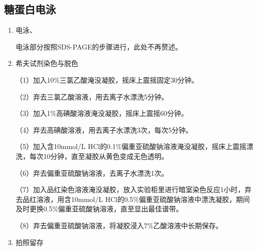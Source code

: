 \subsection{糖蛋白电泳}
\begin{enumerate}
    \item 电泳、

\hspace*{2em} 电泳部分按照SDS-PAGE的步骤进行，此处不再赘述。

    \item 希夫试剂染色与脱色
    
\hspace*{2em} （1）加入10\%三氯乙酸淹没凝胶，摇床上震摇固定30分钟。

\hspace*{2em} （2）弃去三氯乙酸溶液，用去离子水漂洗5分钟。

\hspace*{2em} （3）加入1\%高碘酸溶液淹没凝胶，摇床上震摇60分钟。

\hspace*{2em} （4）弃去高碘酸溶液，用去离子水漂洗3次，每次5分钟。

\hspace*{2em} （5）加入含10mmol/L HCl的0.1\%偏重亚硫酸钠溶液淹没凝胶，摇床上震摇漂洗，每次10分钟，直至凝胶从黄色变成无色透明。

\hspace*{2em} （6）弃去偏重亚硫酸钠溶液，去离子水漂洗1次。

\hspace*{2em} （7）加入品红染色溶液淹没凝胶，放入实验柜里进行暗室染色反应1小时，弃去品红溶液，用含10mmol/L HCl的0.5\%偏重亚硫酸钠溶液中漂洗凝胶，期间及时更换0.5\%偏重亚硫酸钠溶液，直至显出最佳谱带。

\hspace*{2em} （8）弃去偏重亚硫酸钠溶液，将凝胶浸入7\%乙酸溶液中长期保存。

    \item 拍照留存

\end{enumerate}

